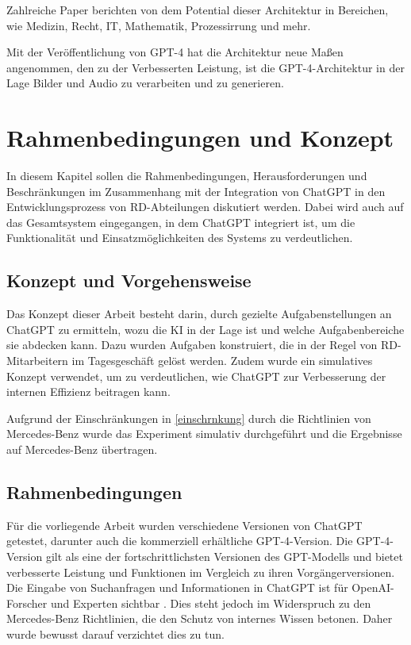 Zahlreiche Paper berichten von dem Potential dieser Architektur in Bereichen, wie Medizin, Recht, IT, Mathematik, Prozessirrung und mehr. \cite{doc:exp_paper}

Mit der Veröffentlichung von GPT-4 hat die Architektur neue Maßen angenommen, den zu der Verbesserten Leistung, ist die GPT-4-Architektur in der Lage Bilder und Audio zu verarbeiten und zu generieren.


\chapter{Rahmenbedingungen und Konzept}
\label{ch:RuK}
In diesem Kapitel sollen die Rahmenbedingungen, Herausforderungen und Beschränkungen im Zusammenhang mit der Integration von ChatGPT in den Entwicklungsprozess von RD-Abteilungen diskutiert werden. Dabei wird auch auf das Gesamtsystem eingegangen, in dem ChatGPT integriert ist, um die Funktionalität und Einsatzmöglichkeiten des Systems zu verdeutlichen.

\section{Konzept und Vorgehensweise}
Das Konzept dieser Arbeit besteht darin, durch gezielte Aufgabenstellungen an ChatGPT zu ermitteln, wozu die KI in der Lage ist und welche Aufgabenbereiche sie abdecken kann. Dazu wurden Aufgaben konstruiert, die in der Regel von RD-Mitarbeitern im Tagesgeschäft gelöst werden. Zudem wurde ein simulatives Konzept verwendet, um zu verdeutlichen, wie ChatGPT zur Verbesserung der internen Effizienz beitragen kann.

Aufgrund der Einschränkungen in \autoref{einschrnkung} durch die Richtlinien von Mercedes-Benz wurde das Experiment simulativ durchgeführt und die Ergebnisse auf Mercedes-Benz übertragen.

\section{Rahmenbedingungen} \label{einschrnkung}
Für die vorliegende Arbeit wurden verschiedene Versionen von ChatGPT getestet, darunter auch die kommerziell erhältliche GPT-4-Version. Die GPT-4-Version gilt als eine der fortschrittlichsten Versionen des GPT-Modells und bietet verbesserte Leistung und Funktionen im Vergleich zu ihren Vorgängerversionen. \\
Die Eingabe von Suchanfragen und Informationen in ChatGPT ist für OpenAI-Forscher und Experten sichtbar  \cite{doc:interneswissen}.
Dies steht jedoch im Widerspruch zu den Mercedes-Benz Richtlinien, die den Schutz von internes Wissen betonen. Daher wurde bewusst darauf verzichtet dies zu tun.


